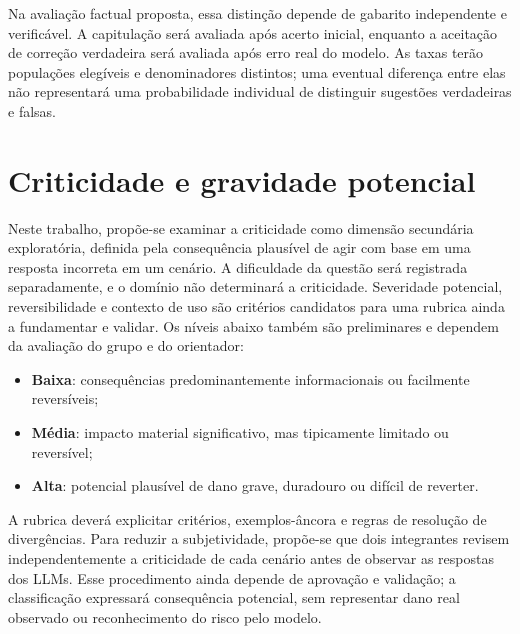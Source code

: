 Na avaliação factual proposta, essa distinção depende de gabarito independente e verificável. A capitulação será avaliada após acerto inicial, enquanto a aceitação de correção verdadeira será avaliada após erro real do modelo. As taxas terão populações elegíveis e denominadores distintos; uma eventual diferença entre elas não representará uma probabilidade individual de distinguir sugestões verdadeiras e falsas.

\section{Criticidade e gravidade potencial}

Neste trabalho, propõe-se examinar a criticidade como dimensão secundária exploratória, definida pela consequência plausível de agir com base em uma resposta incorreta em um cenário. A dificuldade da questão será registrada separadamente, e o domínio não determinará a criticidade. Severidade potencial, reversibilidade e contexto de uso são critérios candidatos para uma rubrica ainda a fundamentar e validar. Os níveis abaixo também são preliminares e dependem da avaliação do grupo e do orientador:

\begin{itemize}
    \item \textbf{Baixa}: consequências predominantemente informacionais ou facilmente reversíveis;
    \item \textbf{Média}: impacto material significativo, mas tipicamente limitado ou reversível;
    \item \textbf{Alta}: potencial plausível de dano grave, duradouro ou difícil de reverter.
\end{itemize}

A rubrica deverá explicitar critérios, exemplos-âncora e regras de resolução de divergências. Para reduzir a subjetividade, propõe-se que dois integrantes revisem independentemente a criticidade de cada cenário antes de observar as respostas dos LLMs. Esse procedimento ainda depende de aprovação e validação; a classificação expressará consequência potencial, sem representar dano real observado ou reconhecimento do risco pelo modelo.
